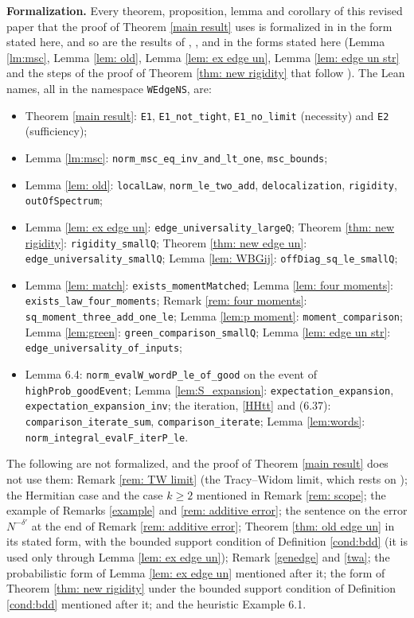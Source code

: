 \medskip
\noindent\textbf{Formalization.} Every theorem, proposition, lemma and corollary of this revised paper that the proof of Theorem \ref{main result} uses is formalized in \cite{Lean} in the form stated here, and so are the results of \cite{EKYY1}, \cite{EKYY2}, \cite[Lemma 4.2]{EYY2} and \cite{EYY} in the forms stated here (Lemma \ref{lm:msc}, Lemma \ref{lem: old}, Lemma \ref{lem: ex edge un}, Lemma \ref{lem: edge un str} and the steps of the proof of Theorem \ref{thm: new rigidity} that follow \cite[Section 5]{EYY}). The Lean names, all in the namespace \texttt{WEdgeNS}, are:
\begin{itemize}
\item Theorem \ref{main result}: \texttt{E1}, \texttt{E1\_not\_tight}, \texttt{E1\_no\_limit} (necessity) and \texttt{E2} (sufficiency);
\item Lemma \ref{lm:msc}: \texttt{norm\_msc\_eq\_inv\_and\_lt\_one}, \texttt{msc\_bounds};
\item Lemma \ref{lem: old}: \texttt{localLaw}, \texttt{norm\_le\_two\_add}, \texttt{delocalization}, \texttt{rigidity}, \texttt{outOfSpectrum};
\item Lemma \ref{lem: ex edge un}: \texttt{edge\_universality\_largeQ}; Theorem \ref{thm: new rigidity}: \texttt{rigidity\_smallQ}; Theorem \ref{thm: new edge un}: \texttt{edge\_universality\_smallQ}; Lemma \ref{lem: WBGij}: \texttt{offDiag\_sq\_le\_smallQ};
\item Lemma \ref{lem: match}: \texttt{exists\_momentMatched}; Lemma \ref{lem: four moments}: \texttt{exists\_law\_four\_moments}; Remark \ref{rem: four moments}: \texttt{sq\_moment\_three\_add\_one\_le}; Lemma \ref{lem:p moment}: \texttt{moment\_comparison}; Lemma \ref{lem:green}: \texttt{green\_comparison\_smallQ}; Lemma \ref{lem: edge un str}: \texttt{edge\_universality\_of\_inputs};
\item Lemma 6.4: \texttt{norm\_evalW\_wordP\_le\_of\_good} on the event of \texttt{highProb\_goodEvent}; Lemma \ref{lem:S_expansion}: \texttt{expectation\_expansion}, \texttt{expectation\_expansion\_inv}; the iteration, \eqref{HHtt} and (6.37): \texttt{comparison\_iterate\_sum}, \texttt{comparison\_iterate}; Lemma \ref{lem:words}: \texttt{norm\_integral\_evalF\_iterP\_le}.
\end{itemize}
The following are not formalized, and the proof of Theorem \ref{main result} does not use them: Remark \ref{rem: TW limit} (the Tracy--Widom limit, which rests on \cite{TR1, TR2}); the Hermitian case and the case $k\ge2$ mentioned in Remark \ref{rem: scope}; the example of Remarks \ref{example} and \ref{rem: additive error}; the sentence on the error $N^{-\delta'}$ at the end of Remark \ref{rem: additive error}; Theorem \ref{thm: old edge un} in its stated form, with the bounded support condition of Definition \ref{cond:bdd} (it is used only through Lemma \ref{lem: ex edge un}); Remark \ref{genedge} and \eqref{twa}; the probabilistic form of Lemma \ref{lem: ex edge un} mentioned after it; the form of Theorem \ref{thm: new rigidity} under the bounded support condition of Definition \ref{cond:bdd} mentioned after it; and the heuristic Example 6.1.

